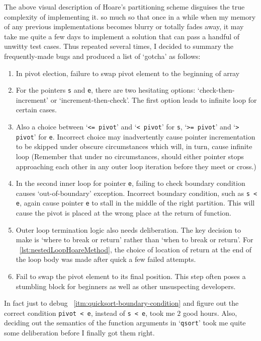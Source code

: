 \documentclass[oneside,11pt]{book}
\theoremstyle{definition}
\theoremstyle{remark}
\newcommand{\code}[1]{\mbox{\lstinline{#1}}}
\begin{document}
The above visual description of Hoare's partitioning scheme disguises the true complexity of
implementing it.
so much so that once in a while when my memory of any previous implementations becomes blurry or
totally fades away, it may take me quite a few days to implement a solution that can pass a
handful of unwitty test cases.
Thus repeated several times, I decided to summary the frequently-made bugs and produced a list of
`gotcha' as follows:
\begin{enumerate}
\item In pivot election, failure to swap pivot element to the beginning of array
    \item For the pointers \code{s} and \code{e}, there are two hesitating options:
    `check-then-increment' or `increment-then-check'.
    The first option leads to infinite loop for certain cases.
    \item Also a choice between `\code{<= pivot}' and `\code{< pivot}' for \code{s},
    `\code{>= pivot}' and `\code{> pivot}' for \code{e}.
    Incorrect choice may inadvertently cause pointer incrementation to be skipped under
    obscure circumstances which will, in turn, cause infinite loop
    (Remember that under no circumstances, should either pointer stops approaching each other in
    any outer loop iteration before they meet or cross.)
    \item\label{itm:quicksort-boundary-condition} In the second inner loop for pointer \code{e},
    failing to check boundary condition causes `out-of-boundary' exception.
    Incorrect boundary condition, such as \code{s < e}, again cause pointer \code{e} to stall
    in the middle of the right partition.
    This will cause the pivot is placed at the wrong place at the return of function.
    \item Outer loop termination logic also needs deliberation.
    The key decision to make is `where to break or return' rather than `when to break or return'.
    For ~\autoref{lst:nestedLoopHoareMethod}, the choice of location of return
    at the end of the loop body was made after quick a few failed attempts.
    \item Fail to swap the pivot element to its final position.
    This step often poses a stumbling block for beginners as well as other unsuspecting
    developers.
\end{enumerate}
In fact just to debug ~\autoref{itm:quicksort-boundary-condition} and
figure out the correct condition \code{pivot < e}, instead of \code{s < e}, took me $2$ good hours.
Also, deciding out the semantics of the function arguments in `\code{qsort}' took me
quite some deliberation before I finally got them right.
\end{document}
